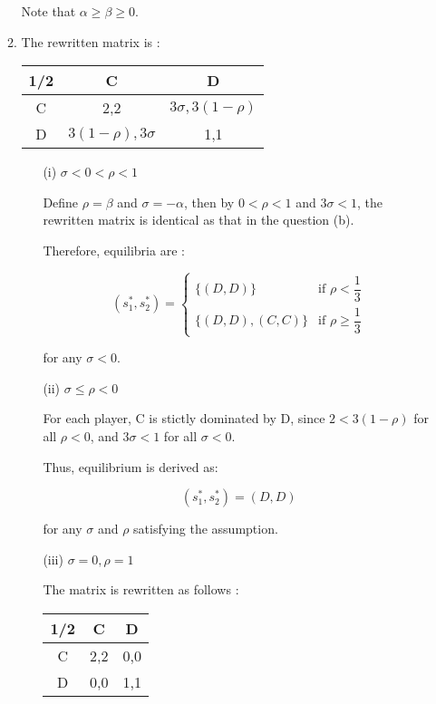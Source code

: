 \documentclass{jsarticle}
\begin{document}
\begin{enumerate}
\begin{enumerate}
Note that $\alpha \geq \beta \geq 0$.

\item

The rewritten matrix is :

\begin{center}

\begin{tabular}{|c|c|c|} \hline
1/2 & C & D \\ \hline
C & 2,2 & $3\sigma, 3(1-\rho)$ \\ \hline
D & $3(1-\rho),3\sigma$ & 1,1 \\ \hline
\end{tabular} 

\end{center}

\newpage

\begin{enumerate}

\item[(i)] $\sigma<0<\rho<1$

Define $\rho=\beta$ and $\sigma=-\alpha$, then by $0< \rho <1$ and $3\sigma <1$, the rewritten matrix is identical as that in the question (b).

Therefore, equilibria are :

\[(s_1^*,s_2^*)=\begin{cases}
\{(D,D)\}  & \text{if } \rho < \dfrac{1}{3} \\
\{(D,D),(C,C) \} & \text{if } \rho \geq \dfrac{1}{3}
\end{cases} \]

for any $\sigma<0$.

\item[(ii)] $\sigma \leq \rho <0$

For each player, C is stictly dominated by D, since $2<3(1-\rho)$ for all $\rho<0$, and $3\sigma< 1$ for all $\sigma<0$.

Thus, equilibrium is derived as:

\[(s_1^*,s_2^*)=(D,D) \]

for any $\sigma$ and $\rho$ satisfying the assumption.

\item[(iii)] $\sigma=0, \rho=1$

The matrix is rewritten as follows :

\begin{center}

\begin{tabular}{|c|c|c|} \hline
1/2 & C & D \\ \hline
C & 2,2 & 0,0 \\ \hline
D & 0,0 & 1,1 \\ \hline
\end{tabular} 


\end{center}
\end{enumerate}
\end{enumerate}
\end{enumerate}
\end{document}

